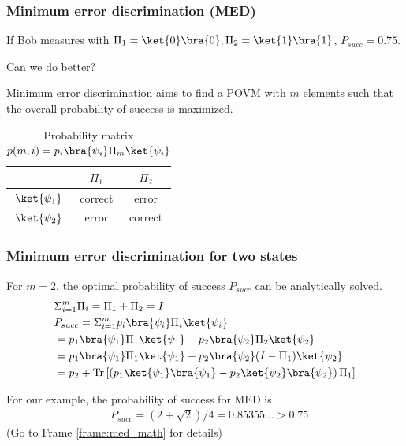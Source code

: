 \documentclass{beamer}
\begin{document}
\begin{frame}
    \frametitle{Minimum error discrimination (MED)}
    If Bob measures with $\Pi_{1} = \ket{0}\bra{0}, \Pi_{2} = \ket{1}\bra{1}$,
    $P_{succ} = 0.75$.

    Can we do better?

    Minimum error discrimination aims to find a POVM with $m$ elements such
    that the overall probability of success is maximized.
    \begin{table}[ht]
        \begin{tabular}{c | c c}
                             & $\Pi_{1}$ & $\Pi_{2}$ \\
            \hline
            $\ket{\psi_{1}}$ & correct   & error     \\
            $\ket{\psi_{2}}$ & error     & correct   \\
        \end{tabular}
        \caption{Probability matrix $p(m,i) = p_{i} \bra{\psi_{i}} \Pi_{m} \ket{\psi_{i}}$}
        \label{tab:med_ex}
    \end{table}
\end{frame}

\begin{frame}
    \label{frame:med_return}
    \frametitle{Minimum error discrimination for two states}
    For $m = 2$, the optimal probability of success $P_{succ}$ can be
    analytically solved.
    \begin{align}
         & \Sigma_{i=1}^{m} \Pi_{i} = \Pi_{1} + \Pi_{2} = I                          \\
         & P_{succ} = \Sigma_{i = 1}^{m} p_{i} \bra{\psi_{i}} \Pi_{i} \ket{\psi_{i}} \\
         & = p_{1} \bra{\psi_{1}} \Pi_{1} \ket{\psi_{1}}
        + p_{2} \bra{\psi_{2}} \Pi_{2} \ket{\psi_{2}}                                \\
         & = p_{1} \bra{\psi_{1}} \Pi_{1} \ket{\psi_{1}}
        + p_{2} \bra{\psi_{2}} (I - \Pi_{1}) \ket{\psi_{2}}                          \\
         & = p_{2} + \operatorname{Tr} \left[
            \left( p_{1} \ket{\psi_{1}}\bra{\psi_{1}}
            - p_{2} \ket{\psi_{2}}\bra{\psi_{2}} \right) \Pi_{1}
            \right] \label{eq:psucc}
    \end{align}

    For our example, the probability of success for MED is
    \begin{align}
         & P_{succ} = (2 + \sqrt{2})/4 = 0.85355\dots > 0.75
    \end{align}
    (Go to Frame \ref{frame:med_math} for details)
\end{frame}
\end{document}
